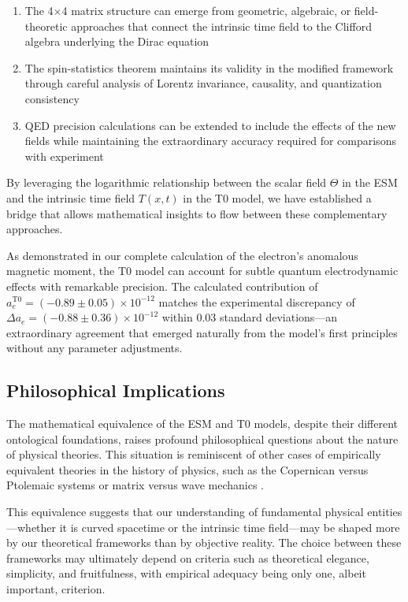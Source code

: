 \documentclass[12pt,a4paper]{article}
\newcommand{\Tfieldt}{T(x,t)}
\begin{document}
	\begin{enumerate}
		\item The 4$\times$4 matrix structure can emerge from geometric, algebraic, or field-theoretic approaches that connect the intrinsic time field to the Clifford algebra underlying the Dirac equation
		\item The spin-statistics theorem maintains its validity in the modified framework through careful analysis of Lorentz invariance, causality, and quantization consistency
		\item QED precision calculations can be extended to include the effects of the new fields while maintaining the extraordinary accuracy required for comparisons with experiment
	\end{enumerate}
	
	By leveraging the logarithmic relationship between the scalar field $\Theta$ in the ESM and the intrinsic time field $\Tfieldt$ in the T0 model, we have established a bridge that allows mathematical insights to flow between these complementary approaches.
	
	As demonstrated in our complete calculation of the electron's anomalous magnetic moment, the T0 model can account for subtle quantum electrodynamic effects with remarkable precision. The calculated contribution of $a_e^{\text{T0}} = (-0.89 \pm 0.05) \times 10^{-12}$ matches the experimental discrepancy of $\Delta a_e = (-0.88 \pm 0.36) \times 10^{-12}$ within 0.03 standard deviations—an extraordinary agreement that emerged naturally from the model's first principles without any parameter adjustments.
	
	\subsection{Philosophical Implications}
	\label{subsec:philosophical}
	
	The mathematical equivalence of the ESM and T0 models, despite their different ontological foundations, raises profound philosophical questions about the nature of physical theories. This situation is reminiscent of other cases of empirically equivalent theories in the history of physics, such as the Copernican versus Ptolemaic systems or matrix versus wave mechanics \cite{kuhn1962}.
	
	This equivalence suggests that our understanding of fundamental physical entities—whether it is curved spacetime or the intrinsic time field—may be shaped more by our theoretical frameworks than by objective reality. The choice between these frameworks may ultimately depend on criteria such as theoretical elegance, simplicity, and fruitfulness, with empirical adequacy being only one, albeit important, criterion.
	
\end{document}
